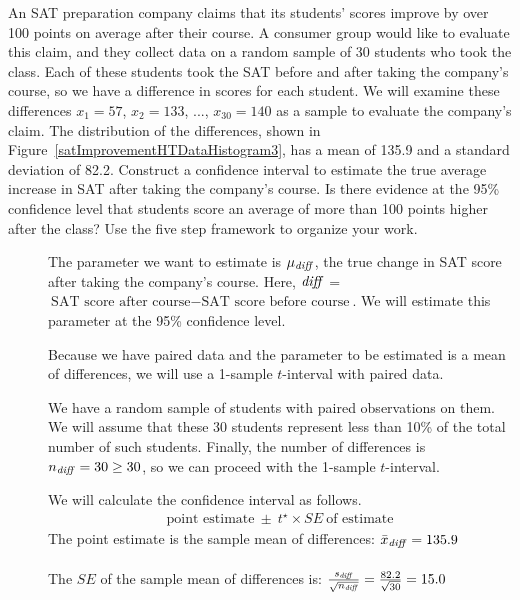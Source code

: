 \begin{examplewrap}
\begin{nexample}
{An SAT preparation company claims that its students' scores improve by over 100 points on average after their course. A consumer group would like to evaluate this claim, and they collect data on a random sample of 30 students who took the class. Each of these students took the SAT before and after taking the company's course, so we have a difference in scores for each student. We will examine these differences $x_1=57$, $x_2=133$, ..., $x_{30}=140$ as a sample to evaluate the company's claim. The distribution of the differences, shown in Figure~\ref{satImprovementHTDataHistogram3}, has a mean of 135.9 and a standard deviation of 82.2. Construct a confidence interval to estimate the true average increase in SAT after taking the company's course.  Is there evidence at the 95\% confidence level that students score an average of more than 100 points higher after the class?  Use the five step framework to organize your work.  
}
\begin{description}
\item[] The parameter we want to estimate is $\mu_{\text{\emph{diff}}}$, the true change in SAT score after taking the company's course.  Here,  ${\text{\emph{diff}}}$ = ${\text{SAT score after course} - \text{SAT score before course}}$.  We will estimate this parameter at the 95\% confidence level.

\item[] Because we have paired data and the parameter to be estimated is a mean of differences, we will use a 1-sample $t$-interval with paired data.

\item[] We have a random sample of students with paired observations on them.  We will assume that these 30 students represent less than 10\% of the total number of such students.  Finally, the number of differences is $n_{\text{\emph{diff}}}=30\ge 30$, so we can proceed with the 1-sample $t$-interval.  
 
\item[]  We will calculate the confidence interval as follows.
\begin{align*}
\text{point estimate}\ \pm\ t^{\star} \times SE\ \text{of estimate}
\end{align*}
The point estimate is the sample mean of differences: $\bar{x}_{\text{\emph{diff}}} = 135.9$\\
\\
The $SE$ of the sample mean of differences is: $ \frac{s_{\text{\emph{diff}}}}{\sqrt{n_{\text{\emph{diff}}}}} = \frac{82.2}{\sqrt{30}}=15.0$\\


\end{description}
\end{nexample}
\end{examplewrap}
